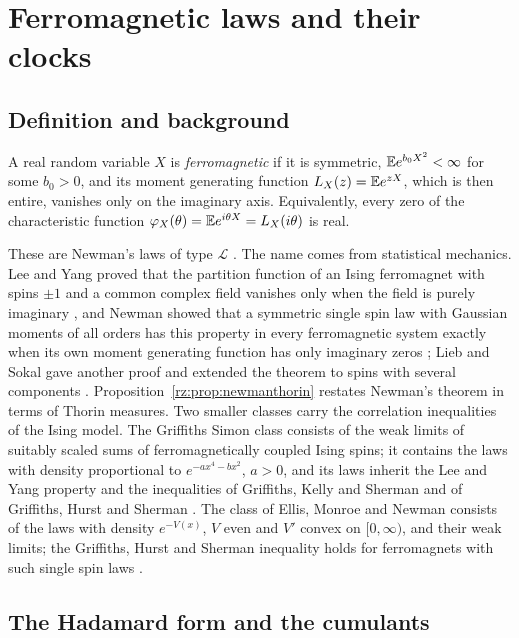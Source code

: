 \section{Ferromagnetic laws and their clocks}\label{ch:fmlaws}

\subsection{Definition and background}\label{fm:sec:def}

\begin{definition}\label{fm:def:ferro}
A real random variable $X$ is \emph{ferromagnetic} if it is symmetric, $\mathbb{E} e^{b_0X^2}<\infty$ for some $b_0>0$, and its moment generating function $L_X(z)=\mathbb{E} e^{zX}$, which is then entire, vanishes only on the imaginary axis. Equivalently, every zero of the characteristic function $\varphi_X(\theta)=\mathbb{E} e^{i\theta X}=L_X(i\theta)$ is real.
\end{definition}

These are Newman's laws of type $\mathcal L$ \cite{Newman75}. The name comes from statistical mechanics. Lee and Yang proved that the partition function of an Ising ferromagnet with spins $\pm1$ and a common complex field vanishes only when the field is purely imaginary \cite{LeeYang}, and Newman showed that a symmetric single spin law with Gaussian moments of all orders has this property in every ferromagnetic system exactly when its own moment generating function has only imaginary zeros \cite{Newman74}; Lieb and Sokal gave another proof and extended the theorem to spins with several components \cite{LiebSokal81}. Proposition~\ref{rz:prop:newmanthorin} restates Newman's theorem in terms of Thorin measures. Two smaller classes carry the correlation inequalities of the Ising model. The Griffiths Simon class consists of the weak limits of suitably scaled sums of ferromagnetically coupled Ising spins; it contains the laws with density proportional to $e^{-ax^4-bx^2}$, $a>0$, and its laws inherit the Lee and Yang property and the inequalities of Griffiths, Kelly and Sherman and of Griffiths, Hurst and Sherman \cite{SimonGriffiths73,GHS70}. The class of Ellis, Monroe and Newman consists of the laws with density $e^{-V(x)}$, $V$ even and $V'$ convex on $[0,\infty)$, and their weak limits; the Griffiths, Hurst and Sherman inequality holds for ferromagnets with such single spin laws \cite{EMN76}.

\subsection{The Hadamard form and the cumulants}\label{fm:sec:hadamard}

